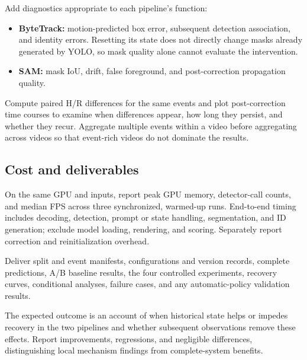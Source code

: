 \documentclass{article}
\begin{document}
Add diagnostics appropriate to each pipeline's function:

\begin{itemize}

\item \textbf{ByteTrack:} motion-predicted box error, subsequent detection association, and identity errors. Resetting its state does not directly change masks already generated by YOLO, so mask quality alone cannot evaluate the intervention.

\item \textbf{SAM:} mask IoU, drift, false foreground, and post-correction propagation quality.

\end{itemize}

Compute paired H/R differences for the same events and plot post-correction time courses to examine when differences appear, how long they persist, and whether they recur. Aggregate multiple events within a video before aggregating across videos so that event-rich videos do not dominate the results.

\subsection{Cost and deliverables}

On the same GPU and inputs, report peak GPU memory, detector-call counts, and median FPS across three synchronized, warmed-up runs. End-to-end timing includes decoding, detection, prompt or state handling, segmentation, and ID generation; exclude model loading, rendering, and scoring. Separately report correction and reinitialization overhead.

Deliver split and event manifests, configurations and version records, complete predictions, A/B baseline results, the four controlled experiments, recovery curves, conditional analyses, failure cases, and any automatic-policy validation results.

The expected outcome is an account of when historical state helps or impedes recovery in the two pipelines and whether subsequent observations remove these effects. Report improvements, regressions, and negligible differences, distinguishing local mechanism findings from complete-system benefits.

\clearpage




\end{document}
